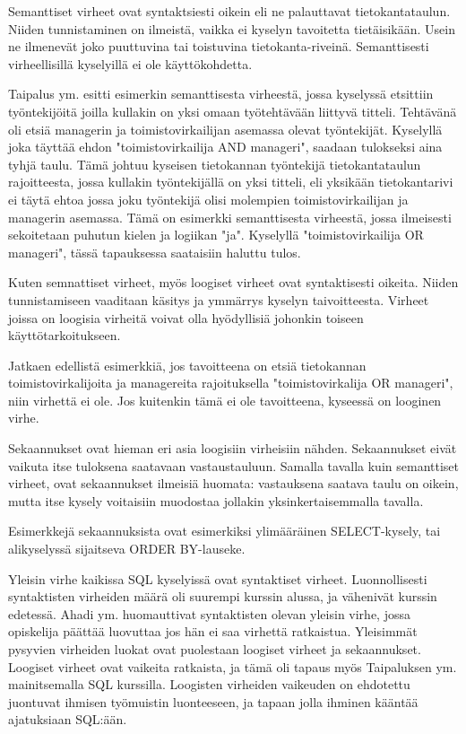 \documentclass[finnish,twoside,openright]{HYgraduMLDS}
\begin{document}
Semanttiset virheet ovat syntaktsiesti oikein eli ne palauttavat tietokantataulun. Niiden tunnistaminen on ilmeistä, vaikka ei kyselyn tavoitetta tietäisikään. Usein ne ilmenevät joko puuttuvina tai toistuvina tietokanta-riveinä. Semanttisesti virheellisillä kyselyillä ei ole käyttökohdetta. 

Taipalus ym. \cite{taipalus2018errors} esitti esimerkin semanttisesta virheestä, jossa kyselyssä etsittiin työntekijöitä joilla kullakin on yksi omaan työtehtävään liittyvä titteli. Tehtävänä oli etsiä managerin ja toimistovirkailijan asemassa olevat työntekijät. Kyselyllä joka täyttää ehdon "toimistovirkailija AND manageri", saadaan tulokseksi aina tyhjä taulu. Tämä johtuu kyseisen tietokannan työntekijä tietokantataulun rajoitteesta, jossa kullakin työntekijällä on yksi titteli, eli yksikään tietokantarivi ei täytä ehtoa jossa joku työntekijä olisi molempien toimistovirkailijan ja managerin asemassa. Tämä on esimerkki semanttisesta virheestä, jossa ilmeisesti sekoitetaan puhutun kielen ja logiikan "ja". Kyselyllä "toimistovirkailija OR manageri", tässä tapauksessa  saataisiin haluttu tulos.

Kuten semnattiset virheet, myös loogiset virheet ovat syntaktisesti oikeita. Niiden tunnistamiseen vaaditaan käsitys ja ymmärrys kyselyn taivoitteesta. Virheet joissa on loogisia virheitä voivat olla hyödyllisiä johonkin toiseen käyttötarkoitukseen. 

Jatkaen edellistä esimerkkiä\cite{taipalus2018errors}, jos tavoitteena on etsiä tietokannan toimistovirkalijoita ja managereita rajoituksella "toimistovirkalija OR manageri", niin virhettä ei ole. Jos kuitenkin tämä ei ole tavoitteena, kyseessä on looginen virhe.

Sekaannukset ovat hieman eri asia loogisiin virheisiin nähden. Sekaannukset eivät vaikuta itse tuloksena saatavaan vastaustauluun. Samalla tavalla kuin semanttiset virheet, ovat sekaannukset ilmeisiä huomata: vastauksena saatava taulu on oikein, mutta itse kysely voitaisiin muodostaa jollakin yksinkertaisemmalla tavalla.

Esimerkkejä sekaannuksista ovat esimerkiksi ylimääräinen SELECT-kysely, tai alikyselyssä sijaitseva ORDER BY-lauseke\cite{taipalus2018errors}.

Yleisin virhe kaikissa SQL kyselyissä ovat syntaktiset virheet\cite{Taipalus:2019:EFS:3287324.3287359, Ahadi:2016:SSM:2839509.2844640}. Luonnollisesti syntaktisten virheiden määrä oli suurempi kurssin alussa, ja vähenivät kurssin edetessä. Ahadi ym. \cite{Ahadi:2016:SSM:2839509.2844640} huomauttivat syntaktisten olevan yleisin virhe, jossa opiskelija päättää luovuttaa jos hän ei saa virhettä ratkaistua. Yleisimmät pysyvien virheiden luokat ovat puolestaan loogiset virheet ja sekaannukset\cite{Taipalus:2019:EFS:3287324.3287359}. Loogiset virheet ovat vaikeita ratkaista, ja tämä oli tapaus myös Taipaluksen ym. \cite{Taipalus:2019:EFS:3287324.3287359} mainitsemalla SQL kurssilla. Loogisten virheiden vaikeuden on ehdotettu juontuvat ihmisen työmuistin luonteeseen, ja tapaan jolla ihminen kääntää ajatuksiaan SQL:ään\cite{SMELCER1995353}. 
\end{document}
